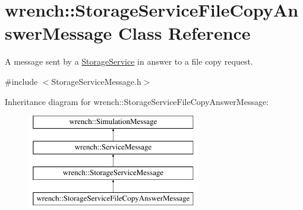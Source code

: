 \hypertarget{classwrench_1_1_storage_service_file_copy_answer_message}{}\section{wrench\+:\+:Storage\+Service\+File\+Copy\+Answer\+Message Class Reference}
\label{classwrench_1_1_storage_service_file_copy_answer_message}


A message sent by a \hyperlink{classwrench_1_1_storage_service}{Storage\+Service} in answer to a file copy request.  




{\ttfamily \#include $<$Storage\+Service\+Message.\+h$>$}

Inheritance diagram for wrench\+:\+:Storage\+Service\+File\+Copy\+Answer\+Message\+:\begin{figure}[H]
\begin{center}
\leavevmode
\includegraphics[height=4.000000cm]{classwrench_1_1_storage_service_file_copy_answer_message}
\end{center}
\end{figure}
